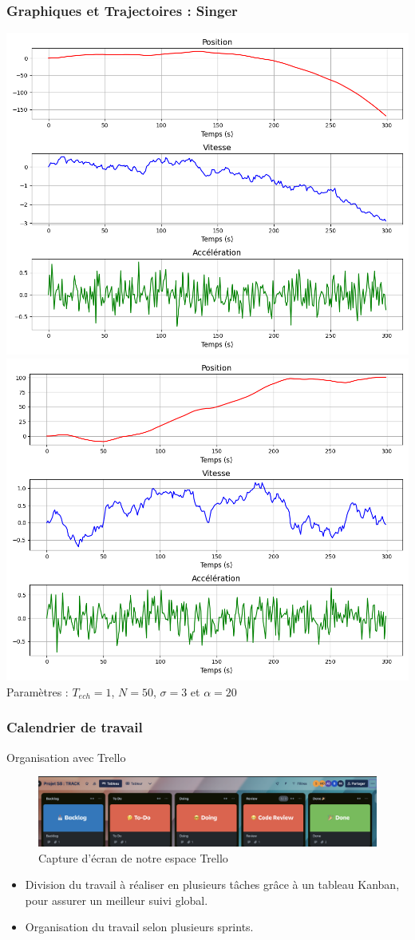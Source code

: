 \documentclass{beamer}
\begin{document}
\begin{frame}
  \frametitle{Graphiques et Trajectoires : Singer}
  \includegraphics[width=.5\textwidth]{images/SINGER_Générations_1.png}\hfill
  \includegraphics[width=.5\textwidth]{images/SINGER_Générations_2.png} 
  Paramètres : $T_{ech} = 1$, $N = 50$, $\sigma = 3$ et $\alpha = 20$
\end{frame}

\begin{frame}
  \frametitle{Calendrier de travail}

\end{frame}

\begin{frame}{Organisation avec Trello}

  \begin{figure}
      \centering
      \includegraphics[width=1\linewidth]{images/trello}
      \caption{Capture d'écran de notre espace Trello}
      \label{fig:trello}
  \end{figure}
  
  \begin{itemize}
      \item Division du travail à réaliser en plusieurs tâches grâce à un tableau Kanban, pour assurer un meilleur suivi global.
      \item Organisation du travail selon plusieurs sprints.
  \end{itemize}
  
\end{frame}
\end{document}
